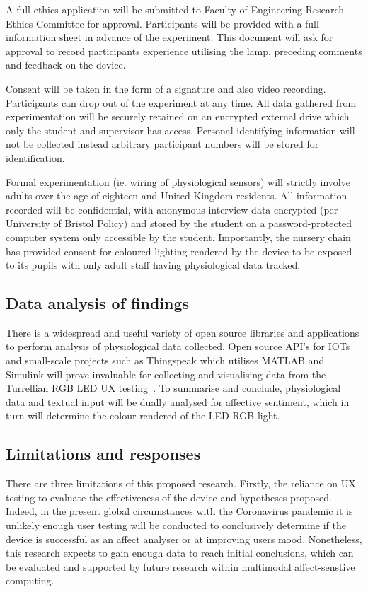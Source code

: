 \documentclass{sigchi}
\begin{document}
A full ethics application will be submitted to Faculty of Engineering Research Ethics Committee for approval. Participants will be provided with a full information sheet in advance of the experiment. This document will ask for approval to record participants experience utilising the lamp, preceding comments and feedback on the device. 

Consent will be taken in the form of a signature and also video recording. Participants can drop out of the experiment at any time. All data gathered from experimentation will be securely retained on an encrypted external drive which only the student and supervisor has access. Personal identifying information will not be collected instead arbitrary participant numbers will be stored for identification. 

Formal experimentation (ie. wiring of physiological sensors) will strictly involve adults over the age of eighteen and United Kingdom residents. All information recorded will be confidential, with anonymous interview data encrypted (per University of Bristol Policy) and stored by the student on a password-protected computer system only accessible by the student. Importantly, the nursery chain has provided consent for coloured lighting rendered by the device to be exposed to its pupils with only adult staff having physiological data tracked. 

\subsection{Data analysis of findings}

There is a widespread and useful variety of open source libraries and applications to perform analysis of physiological data collected. Open source API’s for IOTs and small-scale projects such as Thingspeak which utilises MATLAB and Simulink will prove invaluable for collecting and visualising data from the Turrellian RGB LED UX testing~\cite{Thingspeak01}. To summarise and conclude, physiological data and textual input will be dually analysed for affective sentiment, which in turn will determine the colour rendered of the LED RGB light.


\subsection{Limitations and responses}

There are three limitations of this proposed research. Firstly, the reliance on UX testing to evaluate the effectiveness of the device and hypotheses proposed. Indeed, in the present global circumstances with the Coronavirus pandemic it is unlikely enough user testing will be conducted to conclusively determine if the device is successful as an affect analyser or at improving users mood. Nonetheless, this research expects to gain enough data to reach initial conclusions, which can be evaluated and supported by future research within multimodal affect-senstive computing. 
\end{document}
